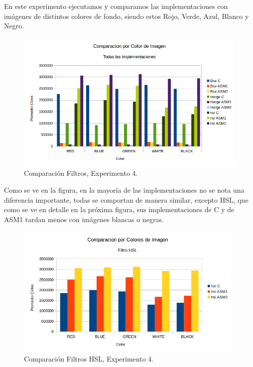 En este experimento ejecutamos y comparamos las implementaciones con imágenes de distintos colores de fondo, siendo estos Rojo, Verde, Azul, Blanco y Negro.

\begin{figure}[ht!]
\centering
\includegraphics[width=120mm]{imagenes/resultados/grafico-colores1.png}
\caption{Comparación Filtros, Experimento 4.}
\end{figure}

Como se ve en la figura, en la mayoría de las implementaciones no se nota una diferencia importante, todas se comportan de manera similar, excepto HSL, que como se ve en detalle en la próxima figura, sus implementaciones de C y de ASM1 tardan menos con imágenes blancas o negras.

\begin{figure}[ht!]
\centering
\includegraphics[width=110mm]{imagenes/resultados/grafico-colores2.png}
\caption{Comparación Filtros HSL, Experimento 4.}
\end{figure}

